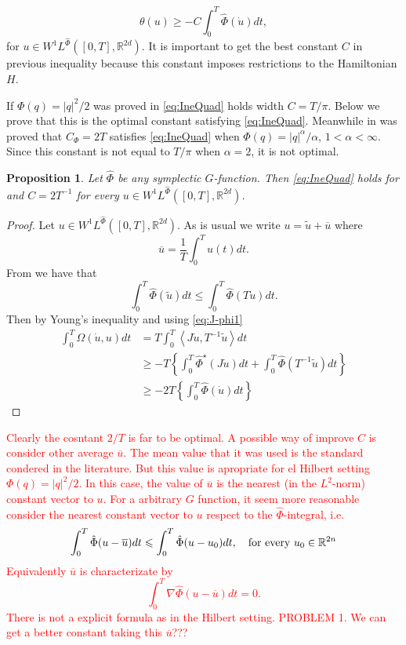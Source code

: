 \documentclass[twoside]{article}
\newtheorem{prop}[thm]{Proposition}
\theoremstyle{remark}
\newcommand{\rr}{\mathbb{R}}
\renewcommand{\leq}{\leqslant}
\renewcommand{\geq}{\geqslant}
\newcommand{\phih}{\hat{\Phi}}
\newcommand{\phihe}{\hat{\Phi}^\star}
\begin{document}
\begin{equation}\label{eq:IneQuad}
 \theta(u)\geq -C\int_0^T\phih\left(\dot{u}\right)dt,
\end{equation}
for $u\in W^1L^{\phih}([0,T],\rr^{2d})$. It is important to get the best constant $C$ in previous inequality because this constant imposes  restrictions to the Hamiltonian $H$. 

If $\Phi(q)=|q|^2/2$ was proved in \cite[Prop. 3.2]{mawhin2010critical} \eqref{eq:IneQuad} holds width $C=T/\pi$.  Below we prove that this is the optimal constant satisfying \eqref{eq:IneQuad}.   Meanwhile in \cite[Lem. 3.3]{Tian2007192} 
was proved that $C_{\Phi}=2T$ satisfies \eqref{eq:IneQuad} when $\Phi(q)=|q|^{\alpha}/\alpha$, $1<\alpha<\infty$. Since this constant is not equal to $T/\pi$ when $\alpha=2$, it is not optimal.

\begin{prop}
 Let $\phih$ be any symplectic $G$-function. Then  \eqref{eq:IneQuad} holds for  and $C=2T^{-1}$ for every  $u\in W^1L^{\phih}([0,T],\rr^{2d})$.
\end{prop}

 \begin{proof} Let  $u\in W^1L^{\phih}([0,T],\rr^{2d})$. As is usual we write $u=\tilde{u}+\overline{u}$ where
 \[\overline{u}=\frac{1}{T}\int_0^Tu(t)dt.\]
 From \cite[Lem. 2.4]{MA2017} we have that
 \[\int_0^T\phih(\tilde{u})dt\leq\int_0^T\phih(T\dot{u})dt.\]
 Then by Young's inequality and using \eqref{eq:J-phi1}
 \[
 \begin{split}
  \int_0^T\Omega\left(\dot{u},u\right)dt &=T\int_0^T\left\langle J\dot{u},T^{-1}\tilde{u}\right\rangle dt\\
  &\geq -T\left\{ \int_0^T\phihe(J\dot{u})dt + \int_0^T\phih(T^{-1}\tilde{u})dt \right\}\\
  &\geq -2T\left\{ \int_0^T\phih(\dot{u})dt \right\}
  \end{split}
 \]
 \end{proof}

\textcolor{red}{ Clearly the cosntant $2/T$ is far to be optimal. A possible way of improve $C$ is consider other average $\overline{u}$. The mean value that it was used is the standard condered in the literature. But this value is apropriate for el Hilbert setting $\Phi(q)=|q|^2/2$. In this case, the value of $\overline{u}$ is the nearest (in the $L^2$-norm) constant vector to $u$. For a arbitrary $G$ function, it seem more reasonable consider    the nearest constant vector to $u$ respect to the $\phih $-integral, i.e.
\[
 \int_0^T\phih(u-\overline{u})dt\leq \int_0^T\phih(u-u_0)dt,\quad\hbox{for every } u_0\in\rr^{2n}
\]
Equivalently $\overline{u}$ is characterizate by
\[
 \int_0^T\nabla\phih(u-\overline{u})dt=0.
\]
There is not a explicit formula as in the Hilbert setting.
\newline
PROBLEM 1. We can get a better constant taking this $\overline{u}$???}
\end{document}
